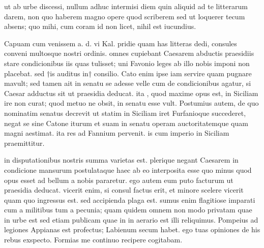 


 ut ab urbe discessi, nullum adhuc intermisi diem quin aliquid ad te litterarum darem, non quo haberem magno opere quod scriberem sed ut loquerer tecum absens; quo mihi, cum coram id non licet, nihil est iucundius.

 Capuam cum venissem a. d. vi Kal. pridie quam has litteras dedi, consules conveni multosque nostri ordinis. omnes cupiebant Caesarem abductis praesidiis stare condicionibus iis quas tulisset; uni Favonio leges ab illo nobis imponi non placebat. sed †is auditus in† consilio. Cato enim ipse iam servire quam pugnare mavult; sed tamen ait in senatu se adesse velle cum de condicionibus agatur, si Caesar adductus sit ut praesidia deducat. ita , quod maxime opus est, in Siciliam ire non curat; quod metuo ne obsit, in senatu esse vult. Postumius autem, de quo nominatim senatus decrevit ut statim in Siciliam iret Furfanioque succederet, negat se sine Catone iturum et suam in senatu operam auctoritatemque quam magni aestimat. ita res ad Fannium pervenit. is cum imperio in Siciliam praemittitur.

 in disputationibus nostris summa varietas est. plerique negant Caesarem in condicione mansurum postulataque haec ab eo interposita esse quo minus quod opus esset ad bellum a nobis pararetur. ego autem eum puto facturum ut praesidia deducat. vicerit enim, si consul factus erit, et minore scelere vicerit quam quo ingressus est. sed accipienda plaga est. sumus enim flagitiose imparati cum a militibus tum a pecunia; quam quidem omnem non modo privatam quae in urbe est sed etiam publicam quae in in aerario est illi reliquimus. Pompeius ad legiones Appianas est profectus; Labienum secum habet. ego tuas opiniones de his rebus exspecto. Formias me continuo recipere cogitabam.
